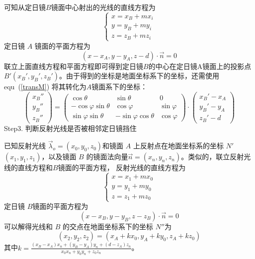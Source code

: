 \documentclass[../main.tex]{subfiles}
\begin{document}
可知从定日镜\(B\)镜面中心射出的光线的直线方程为
\[
\begin{cases}
x = x _{B} + m x_{i}\\
y = y _{B} + my_{i} \\
z = z_{B} + m z_{i}
\end{cases}
\]
定日镜 \(A\) 镜面的平面方程为
\[
(x - x_{A} , y- y _{A} , z - d) \cdot \vec n = 0
\]
联立上面直线方程和平面方程即可得到定日镜\(B\)的中心在定日镜A镜面上的投影点 \(B' (x_{B}' , y_{B} ' , z _{B} ')\)。由于得到的坐标是地面坐标系下的坐标，还需使用 equ~(\ref{transM}) 将其转化为\(A\)镜面系下的坐标：
\[
\begin{pmatrix}
x_{B} ''\\
y_{B} ''\\
z _{B} ''
\end{pmatrix}
=
\begin{pmatrix}
\cos \theta & \sin \theta & 0\\
-\cos \varphi \sin \theta & \cos \varphi & \sin \varphi \\
\sin \varphi \sin \theta & - \sin \varphi \cos \theta & \cos \varphi
\end{pmatrix}
\cdot
\begin{pmatrix}
x_{B} ' - x_{A}\\
y_{B}' - y_{A} \\
z_{B} ' - d
\end{pmatrix}
\]
Step3. 判断反射光线是否被相邻定日镜挡住

已知反射光线 \(\vec \lambda _{o} = (x_0,y_0,z_0)\)和镜面 \(A\) 上反射点在地面坐标系的坐标 \(N'\)\((x_1, y_1, z_1)\)，以及镜面 \(B\) 的镜面法向量\(\vec n = (x_{n} , y_{n} ,z_{n})\)。类似的，联立反射光线的直线方程和\(B\)镜面的平面方程，
反射光线的直线方程为
\[
\begin{cases}
x = x_1 + m x_0\\
y = y_1 + m y_0\\
z = z_1 + m z_0
\end{cases}
\]
定日镜 \(B\)镜面的平面方程为
\[
(x - x_{B} , y - y_{B} , z-z_{B}) \cdot \vec n = 0
\]
可以解得光线和 \(B\) 的交点在地面坐标系下的坐标 \(N''\)为
\[
(x_2 , y_2, z_2) = (x_{A} + k x_0, y_{A} + ky_{0} , z_{A} + kz_{0})
\]
其中\(k = \displaystyle \frac{(x_{B} - x_{A}) x_{n} + (y_{B} - y_{A}) y_{n} + (d- z_{A}) z_{n}}{x_0 x_{n} + y_{0} y_{n} + z_{0} z _{n}}\)。
\end{document}
